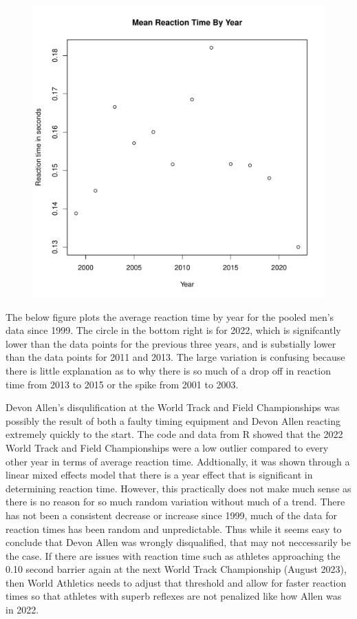 \documentclass[12pt, letterpaper, titlepage]{article}
\begin{document}
\begin{figure}[h]
  \centering 
  \includegraphics[scale = 1]{TBY}
  \label{fig:TBY}
\end{figure}

The below figure plots the average reaction time by year for the pooled men's data since
1999.  The circle in the bottom right is for 2022, which is signifcantly lower than the
data points for the previous three years, and is substially lower than the data points
for 2011 and 2013.  The large variation is confusing because there is little explanation
as to why there is so much of a drop off in reaction time from 2013 to 2015 or the spike
from 2001 to 2003.

Devon Allen's disqulification at the World Track and Field Championships was
possibly the result of both a faulty timing equipment and Devon Allen
reacting extremely quickly to the start.  The code and data from R showed that
the 2022 World Track and Field Championships were a low outlier compared to
every other year in terms of average reaction time.  Addtionally, it was shown
through a linear mixed effects model that there is a year effect that is significant
in determining reaction time.  However, this practically does not make much sense
as there is no reason for so much random variation without much of a trend.
There has not been a consistent decrease or increase since 1999, much of the data
for reaction times has been random and unpredictable.  Thus while it seems easy
to conclude that Devon Allen was wrongly disqualified, that may not neccessarily
be the case.  If there are issues with reaction time such as athletes approaching the 0.10 
second barrier again at the next World Track Championship (August 2023), then World Athletics 
needs to adjust that threshold and allow for faster reaction times so that athletes with superb 
reflexes are not penalized like how Allen was in 2022.
\end{document}
